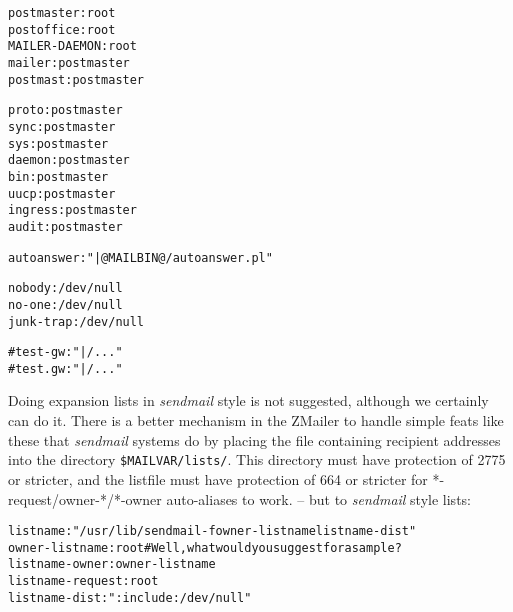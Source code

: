 \begin{alltt}
postmaster: root
postoffice: root
MAILER-DAEMON: root
mailer:     postmaster
postmast:   postmaster

proto:  postmaster
sync:   postmaster
sys:    postmaster
daemon: postmaster
bin:    postmaster
uucp:   postmaster
ingress: postmaster
audit:  postmaster

autoanswer: "|@MAILBIN@/autoanswer.pl"

nobody: /dev/null
no-one: /dev/null
junk-trap: /dev/null

#test-gw: "|/..."
#test.gw: "|/..."
\end{alltt}

Doing expansion lists in {\em sendmail} style is not suggested, although
we certainly can do it.  There is a better mechanism in the ZMailer
to handle simple feats like these that {\em sendmail} systems do by placing
the file containing recipient addresses into the directory  
{\tt \$MAILVAR/lists/}.
This directory must have protection of 2775 or stricter, and the listfile
must have protection of 664 or stricter for *-request/owner-*/*-owner
auto-aliases to work. -- but to {\em sendmail} style lists:

\begin{alltt}
listname: "/usr/lib/sendmail -fowner-listname listname-dist"
owner-listname: root # Well, what would you suggest for a sample ?
listname-owner: owner-listname
listname-request: root
listname-dist: ":include:/dev/null"
\end{alltt}
